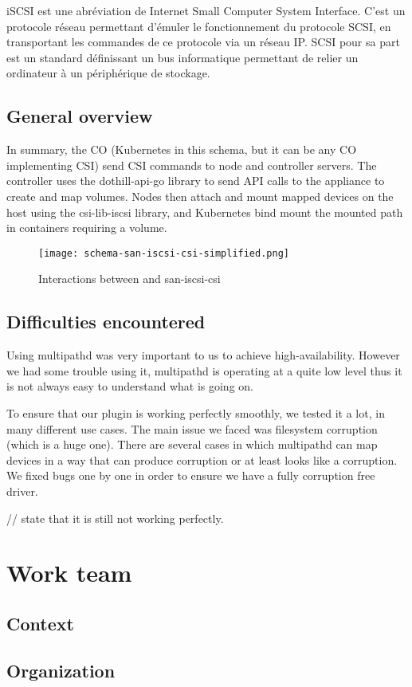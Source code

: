 \color{darkgreen}
iSCSI est une abréviation de Internet Small Computer System Interface. C'est un protocole réseau permettant d'émuler le fonctionnement du protocole SCSI, en transportant les commandes de ce protocole via un réseau IP. SCSI pour sa part est un standard définissant un bus informatique permettant de relier un ordinateur à un périphérique de stockage.
\color{black}

\subsection{General overview}

\color{darkgreen}
In summary, the CO (Kubernetes in this schema, but it can be any CO implementing CSI) send CSI commands to node and controller servers. The controller uses the dothill-api-go library to send API calls to the appliance to create and map volumes. Nodes then attach and mount mapped devices on the host using the csi-lib-iscsi library, and Kubernetes bind mount the mounted path in containers requiring a volume.
\color{black}

\begin{figure}[h]
    \centering
    \texttt{[image: schema-san-iscsi-csi-simplified.png]}
    \caption{Interactions between  and \gls{san-iscsi-csi}}
    \label{fig:k8s-san-scsi-csi}
\end{figure}

\subsection{Difficulties encountered}

\color{darkgreen}
Using multipathd was very important to us to achieve high-availability. However we had some trouble using it, multipathd is operating at a quite low level thus it is not always easy to understand what is going on.

To ensure that our plugin is working perfectly smoothly, we tested it a lot, in many different use cases. The main issue we faced was filesystem corruption (which is a huge one). There are several cases in which multipathd can map devices in a way that can produce corruption or at least looks like a corruption. We fixed bugs one by one in order to ensure we have a fully corruption free driver.

// state that it is still not working perfectly.
\color{black}

\section{Work team}

\subsection{Context}

\subsection{Organization}

\clearpage

